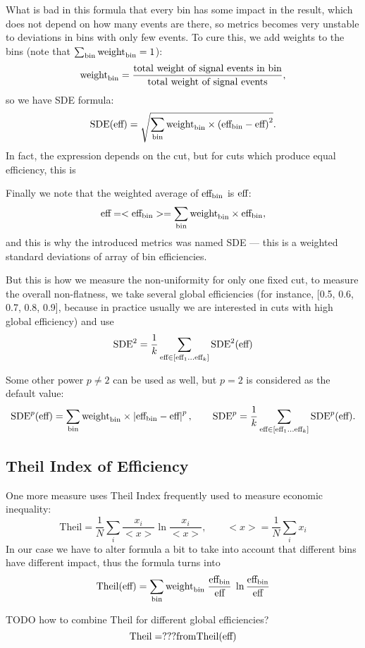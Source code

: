 What is bad in this formula that every bin has some impact in the result, which does not depend on how many events are there, so metrics becomes very unstable to deviations in bins with only few events. To cure this, we add weights to the bins (note that $\sum_{\text{bin}} \text{weight}_\text{bin} = 1$):
\[
	\text{weight}_\text{bin} = \dfrac{\text{total weight of signal events in bin}}
		{\text{total weight of signal events}},
\]
so we have SDE formula:
\[
	\text{SDE}(\text{eff}) = 
	\sqrt{\sum_{\text{bin}} \text{weight}_\text{bin} \times \left(\text{eff}_\text{bin} - \text{eff} \right)^2}. 
\] 
In fact, the expression depends on the cut, but for cuts which produce equal efficiency, this is 


Finally we note that the weighted average of $\text{eff}_\text{bin}$ is $\text{eff}$:
\[
	\text{eff} = < \text{eff}_\text{bin} > =  \sum_{\text{bin}} \text{weight}_\text{bin} \times \text{eff}_\text{bin},
\]
and this is why the introduced metrics was named SDE --- this is a weighted standard deviations of array of bin efficiencies.

But this is how we measure the non-uniformity for only one fixed cut, to measure the overall non-flatness, we take several global efficiencies (for instance, [0.5, 0.6, 0.7, 0.8, 0.9], because in practice usually we are interested in cuts with high global efficiency) and use 
\[
	\text{SDE}^2  =  \frac{1}{k} 
	\sum_{\text{eff} \in [\text{eff}_1 \dots \text{eff}_k] }  
		\text{SDE}^2(\text{eff})
\]

Some other power $p \neq 2$ can be used as well, but $p=2$ is considered as the default value: 
\[
	\text{SDE}^p(\text{eff}) = 
	\sum_{\text{bin}} \text{weight}_\text{bin} \times \left\vert\text{eff}_\text{bin} - \text{eff}\right\vert^p,
\qquad
	\text{SDE}^p  =  \frac{1}{k} 
	\sum_{\text{eff} \in [\text{eff}_1 \dots \text{eff}_k] }  
		\text{SDE}^p(\text{eff}).
\]



\subsection{Theil Index of Efficiency}
\def\theil{\text{Theil}}

One more measure uses Theil Index frequently used to measure economic inequality:
\[
	\theil = \frac{1}{N} \sum_i \frac{x_i}{<x>} \ln{\frac{x_i}{<x>}}, 
		\qquad <x> = \frac{1}{N} \sum_i x_i
\]
In our case we have to alter formula a bit to take into account that different bins have different impact, thus the formula turns into
\[
	\theil(\globaleff) = \sum_\bin \binweight \; \frac{\bineff}{\globaleff} \; \ln{\frac{\bineff}{\globaleff}}
\]

TODO how to combine Theil for different global efficiencies?
\[
	\theil = ??? \text{from} \theil(\globaleff)
\]

